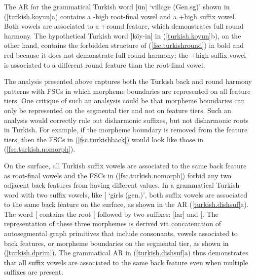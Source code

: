 \documentclass[,doc,floatsintext]{apa6}
\theoremstyle{definition}
\theoremstyle{definition}
\theoremstyle{definition}
\theoremstyle{remark}
\begin{document}
\noindent The AR for the grammatical Turkish word
{[}ün{]} `village (Gen.sg)' shown in
(\ref{turkish.koyun}a) contains a -high root-final vowel and a +high
suffix vowel. Both vowels are associated to a +round feature, which
demonstrates full round harmony. The hypothetical Turkish word
{[}köy-in{]} in (\ref{turkish.koyun}b), on the other hand, contains the
forbidden structure of (\ref{fsc.turkishround}) in bold and red because
it does not demonstrate full round harmony; the +high suffix vowel is
associated to a different round feature than the root-final vowel.

The analysis presented above captures both the Turkish back and round
harmony patterns with FSCs in which morpheme boundaries are represented
on all feature tiers. One critique of such an analsysis could be that
morpheme boundaries can only be represented on the segmental tier and
not on feature tiers. Such an analysis would correctly rule out
disharmonic suffixes, but not disharmonic roots in Turkish. For example,
if the morpheme boundary is removed from the feature tiers, then the
FSCs in (\ref{fsc.turkishback}) would look like those in
(\ref{fsc.turkish.nomorph}).

\begin{exe}
\ex \label{fsc.turkish.nomorph}
\end{exe}

On the surface, all Turkish suffix vowels are associated to the same
back feature as root-final vowels and the FSCs in
(\ref{fsc.turkish.nomorph}) forbid any two adjacent back features from
having different values. In a grammatical Turkish word with two suffix
vowels, like
{[}\textipa{\LARGE+}\textipa{1n}{]}
`girls (gen.)', both suffix vowels are associated to the same back
feature on the surface, as shown in the AR (\ref{turkish.dishsuf}a). The
word
{[}\textipa{\LARGE+}\textipa{1n}{]}
contains the root {[}\textipa{k1z}{]} followed by two suffixes:
{[}lar{]} and {[}\textipa{1n}{]}. The representation of these three
morphemes is derived via concatenation of autosegmental graph primitives
that include consonants, vowels associated to back features, or morpheme
boundaries on the segmental tier, as shown in (\ref{turkish.dprim}). The
grammatical AR in (\ref{turkish.dishsuf}a) thus demonstrates that all
suffix vowels are associated to the same back feature even when multiple
suffixes are present.
\end{document}
